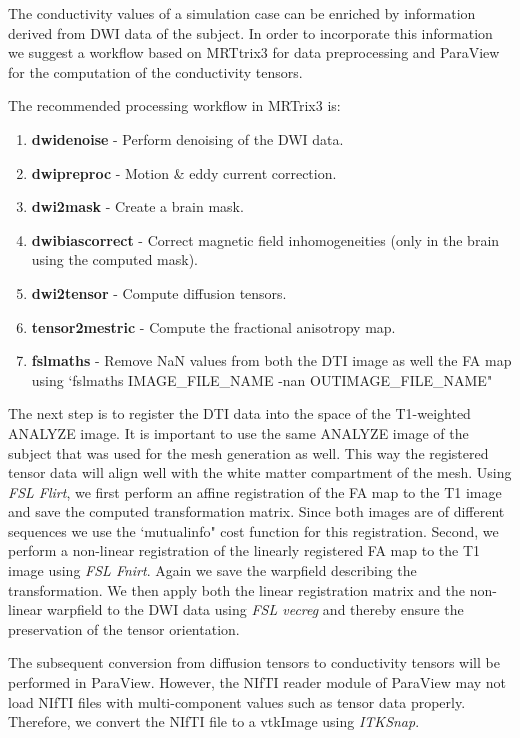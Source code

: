 The conductivity values of a simulation case can be enriched by information derived from DWI data of the subject.
In order to incorporate this information we suggest a workflow based on MRTtrix3 for data preprocessing and ParaView
for the computation of the conductivity tensors.\par
The recommended processing workflow in MRTrix3 is:
\begin{enumerate}
    \item \textbf{dwidenoise} - Perform denoising of the DWI data.
    \item \textbf{dwipreproc} - Motion \& eddy current correction.
    \item \textbf{dwi2mask} - Create a brain mask.
    \item \textbf{dwibiascorrect} - Correct magnetic field inhomogeneities (only in the brain using the computed mask).
    \item \textbf{dwi2tensor} - Compute diffusion tensors.
    \item \textbf{tensor2mestric} - Compute the fractional anisotropy map. 
    \item \textbf{fslmaths} - Remove NaN values from both the DTI image as well the FA map using 
          `fslmaths IMAGE\_FILE\_NAME -nan OUTIMAGE\_FILE\_NAME"
\end{enumerate}
The next step is to register the DTI data into the space of the T1-weighted ANALYZE image. It is important to use the same
ANALYZE image of the subject that was used for the mesh generation as well. This way the registered tensor data will
align well with the white matter compartment of the mesh. Using \emph{FSL Flirt}, we first perform an affine
registration of the FA map to the T1 image and save the computed transformation matrix. Since both images are of different
sequences we use the `mutualinfo" cost function for this registration. Second, we perform a non-linear registration of the
linearly registered FA map to the T1 image using \emph{FSL Fnirt}. Again we save the warpfield describing the transformation.
We then apply both the linear registration matrix and the non-linear warpfield to the DWI data using \emph{FSL vecreg}
and thereby ensure the preservation of the tensor orientation.\par
The subsequent conversion from diffusion tensors to conductivity tensors will be performed in ParaView. However, the
NIfTI reader module of ParaView may not load NIfTI files with multi-component values such as tensor data properly. Therefore,
we convert the NIfTI file to a vtkImage using \emph{ITKSnap}.\par
